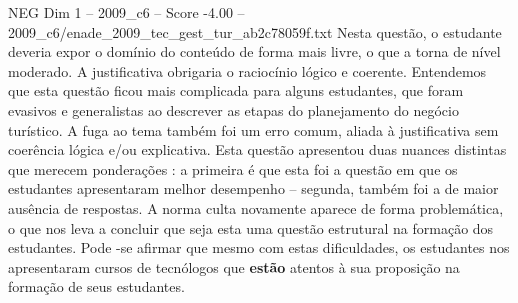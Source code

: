 \begin{textsample}{NEG Dim 1 – 2009\_c6 – Score -4.00 – 2009\_c6/enade\_2009\_tec\_gest\_tur\_ab2c78059f.txt}
Nesta questão, o estudante deveria expor o domínio do conteúdo de forma mais livre, o que a torna de nível moderado.
A justificativa obrigaria o raciocínio lógico e coerente.
Entendemos que esta questão ficou mais complicada para alguns estudantes, que foram evasivos e generalistas ao descrever as etapas do planejamento do negócio turístico.
A fuga ao tema também foi um erro comum, aliada à justificativa sem coerência lógica e/ou explicativa.
Esta questão apresentou duas nuances distintas que merecem ponderações : a primeira é que esta foi a questão em que os estudantes apresentaram melhor desempenho – segunda, também foi a de maior ausência de respostas.
A norma culta novamente aparece de forma problemática, o que nos leva a concluir que seja esta uma questão estrutural na formação dos estudantes.
Pode -se afirmar que mesmo com estas dificuldades, os estudantes nos apresentaram cursos de tecnólogos que \textbf{estão} atentos à sua proposição na formação de seus estudantes.

\end{textsample}

